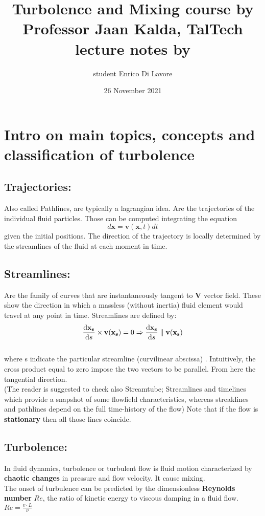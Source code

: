 \documentclass[a4paper,11pt]{article}
\begin{document}
\title{%
Turbolence and Mixing course by\\
Professor Jaan Kalda, TalTech\\
lecture notes by}
\author{student Enrico Di Lavore}
\date{26 November 2021}
\maketitle


	\section{Intro on main topics, concepts and classification of turbolence}
	
\subsection {Trajectories:}
Also called Pathlines, are typically a lagrangian idea. Are the trajectories of the individual fluid particles. 
Those can be computed integrating the equation
\[ d\mathbf{x}=\mathbf{v}(\mathbf{x},t) dt   \]
given the initial positions.
The direction of the trajectory is locally determined by the streamlines of the fluid at each moment in time.

\subsection{Streamlines:}
Are the family of curves that are instantaneously tangent to $\mathbf{V}$ vector field. These show the direction in which a massless (without inertia) fluid element would travel at any point in time.
Streamlines are defined by:
\[ \dv{\mathbf{x_s}}{s}  \times \mathbf{v}(\mathbf{x_s})=0  \Rightarrow \dv{\mathbf{x_s}}{s}\parallel  \mathbf{v}(\mathbf{x_s})   \] \\
where s indicate the particular streamline (curvilinear abscissa) . Intuitively, the cross product equal to zero impose the two vectors to be parallel. From here the tangential direction.\\
(The reader is suggested to check also Streamtube; Streamlines and timelines which provide a snapshot of some flowfield characteristics, whereas streaklines and pathlines depend on the full time-history of the flow)
Note that if the flow is \textbf{stationary} then all those lines coincide. %

\subsection {Turbolence:} 
In fluid dynamics, turbolence or turbulent flow is fluid motion characterized by \textbf{chaotic changes} in pressure and flow velocity. It cause mixing.\\
The onset of turbulence can be predicted by the dimensionless \textbf{Reynolds number} $Re$, the ratio of kinetic energy to viscous damping in a fluid flow. $Re=\frac{v \cdot L}{\nu}$
\end{document}
